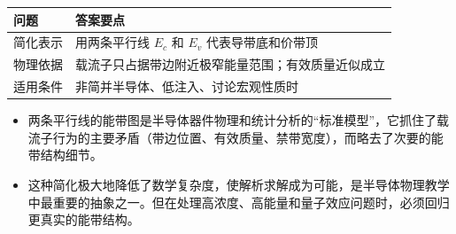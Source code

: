 \begin{formulabox}[答案汇总]
\begin{center}
\begin{tabular}{ll}
\toprule
\textbf{问题} & \textbf{答案要点} \\
\midrule
简化表示 & 用两条平行线 $E_c$ 和 $E_v$ 代表导带底和价带顶 \\
物理依据 & 载流子只占据带边附近极窄能量范围；有效质量近似成立 \\
适用条件 & 非简并半导体、低注入、讨论宏观性质时 \\
\bottomrule
\end{tabular}
\end{center}
\end{formulabox}

\begin{insightbox}[物理图像]
\begin{itemize}
    \item 两条平行线的能带图是半导体器件物理和统计分析的``标准模型''，它抓住了载流子行为的主要矛盾（带边位置、有效质量、禁带宽度），而略去了次要的能带结构细节。
    \item 这种简化极大地降低了数学复杂度，使解析求解成为可能，是半导体物理教学中最重要的抽象之一。但在处理高浓度、高能量和量子效应问题时，必须回归更真实的能带结构。
\end{itemize}
\end{insightbox}

